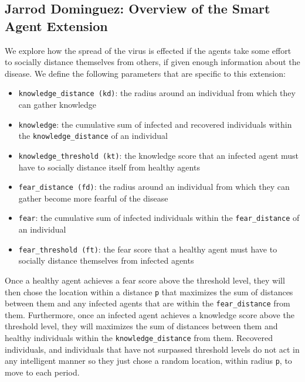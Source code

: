 \documentclass[twoside]{extarticle}                                    %
\numberwithin{equation}{section}                                       %
\begin{document}
\subsection{Jarrod Dominguez: Overview of the Smart Agent Extension}
We explore how the spread of the virus is effected if the agents take some effort to socially distance themselves from others, if given enough information about the disease. We define the following parameters that are specific to this extension:
\begin{itemize}[itemsep = 0em]
    \item \texttt{knowledge\_distance (kd)}: the radius around an individual from which they can gather knowledge
    \item \texttt{knowledge}: the cumulative sum of infected and recovered individuals within the \texttt{knowledge\_distance} of an individual
    \item \texttt{knowledge\_threshold (kt)}: the knowledge score that an infected agent must have to socially distance itself from healthy agents
    \item \texttt{fear\_distance (fd)}: the radius around an individual from which they can gather become more fearful of the disease
    \item \texttt{fear}: the cumulative sum of infected individuals within the \texttt{fear\_distance} of an individual
    \item \texttt{fear\_threshold (ft)}: the fear score that a healthy agent must have to socially distance themselves from infected agents
\end{itemize}
Once a healthy agent achieves a fear score above the threshold level, they will then chose the location within a distance \texttt{p} that maximizes the sum of distances between them and any infected agents that are within the \texttt{fear\_distance} from them. Furthermore, once an infected agent achieves a knowledge score above the threshold level, they will maximizes the sum of distances between them and healthy individuals within the \texttt{knowledge\_distance} from them. Recovered individuals, and individuals that have not surpassed threshold levels do not act in any intelligent manner so they just chose a random location, within radius \texttt{p}, to move to each period.
\end{document}
